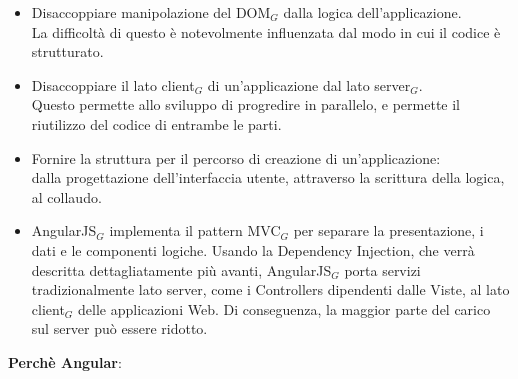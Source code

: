 \begin{itemize}
	\item Disaccoppiare manipolazione del DOM$_G$ dalla logica dell'applicazione.\\
	La difficoltà di questo è notevolmente influenzata dal modo in cui il codice è strutturato.
	\item Disaccoppiare il lato client$_G$  di un'applicazione dal lato server$_G$.\\
	Questo permette allo sviluppo di progredire in parallelo, e permette il riutilizzo del codice di entrambe le parti.
	\item Fornire la struttura per il percorso di creazione di un'applicazione:\\
	dalla progettazione dell'interfaccia utente, attraverso la scrittura della logica, al collaudo.
	\item AngularJS$_G$ implementa il pattern MVC$_G$ per separare la presentazione, i dati e le componenti logiche. Usando la Dependency Injection, che verrà descritta dettagliatamente più avanti, AngularJS$_G$ porta servizi  tradizionalmente lato server, come i Controllers dipendenti dalle Viste, al lato client$_G$ delle applicazioni Web. Di conseguenza, la maggior parte del carico sul server può essere ridotto.
\end{itemize}
\textbf{Perchè Angular}:

